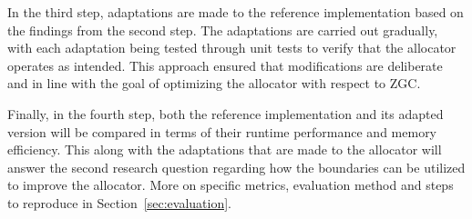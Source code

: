 In the third step, adaptations are made to the reference implementation based on the findings from the second step. The adaptations are carried out gradually, with each adaptation being tested through unit tests to verify that the allocator operates as intended. This approach ensured that modifications are deliberate and in line with the goal of optimizing the allocator with respect to ZGC.

Finally, in the fourth step, both the reference implementation and its adapted version will be compared in terms of their runtime performance and memory efficiency. This along with the adaptations that are made to the allocator will answer the second research question regarding how the boundaries can be utilized to improve the allocator. More on specific metrics, evaluation method and steps to reproduce in Section~\ref{sec:evaluation}.

